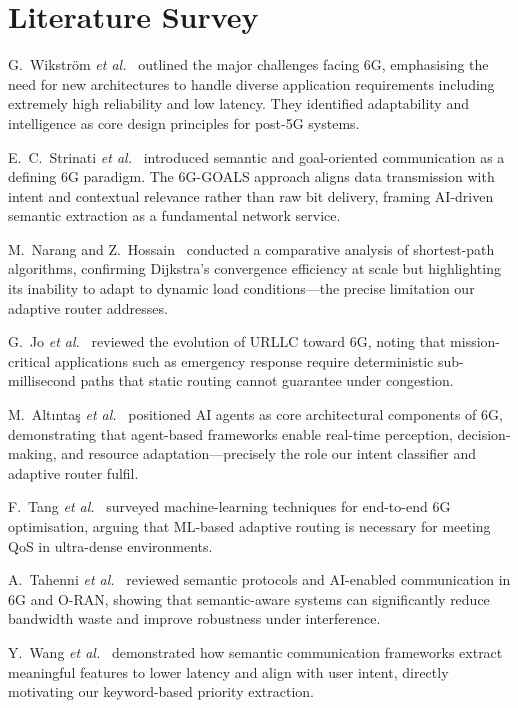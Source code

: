 \documentclass[conference]{IEEEtran}
\begin{document}
\section{Literature Survey}

G.~Wikstr\"{o}m \textit{et al.}~\cite{b1} outlined the major challenges
facing 6G, emphasising the need for new architectures to handle diverse
application requirements including extremely high reliability and low latency.
They identified adaptability and intelligence as core design principles for
post-5G systems.

E.~C.~Strinati \textit{et al.}~\cite{b2} introduced semantic and
goal-oriented communication as a defining 6G paradigm.  The 6G-GOALS approach
aligns data transmission with intent and contextual relevance rather than raw
bit delivery, framing AI-driven semantic extraction as a fundamental network
service.

M.~Narang and Z.~Hossain~\cite{b3} conducted a comparative analysis of
shortest-path algorithms, confirming Dijkstra's convergence efficiency at scale
but highlighting its inability to adapt to dynamic load conditions—the precise
limitation our adaptive router addresses.

G.~Jo \textit{et al.}~\cite{b4} reviewed the evolution of URLLC toward 6G,
noting that mission-critical applications such as emergency response require
deterministic sub-millisecond paths that static routing cannot guarantee under
congestion.

M.~Alt\i nta\c{s} \textit{et al.}~\cite{b5} positioned AI agents as
core architectural components of 6G, demonstrating that agent-based
frameworks enable real-time perception, decision-making, and resource
adaptation—precisely the role our intent classifier and adaptive router fulfil.

F.~Tang \textit{et al.}~\cite{b6} surveyed machine-learning techniques for
end-to-end 6G optimisation, arguing that ML-based adaptive routing is necessary
for meeting QoS in ultra-dense environments.

A.~Tahenni \textit{et al.}~\cite{b7} reviewed semantic protocols and
AI-enabled communication in 6G and O-RAN, showing that semantic-aware systems
can significantly reduce bandwidth waste and improve robustness under
interference.

Y.~Wang \textit{et al.}~\cite{b8} demonstrated how semantic communication
frameworks extract meaningful features to lower latency and align with user
intent, directly motivating our keyword-based priority extraction.
\end{document}

